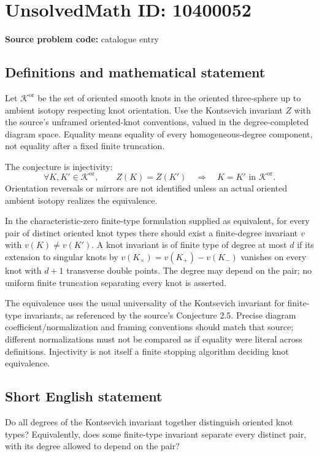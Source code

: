 \documentclass[11pt]{article}
\begin{document}
\section*{UnsolvedMath ID: 10400052}
\textbf{Source problem code:} catalogue entry
\subsection{Definitions and mathematical statement}
Let $\mathcal K^{\mathrm{or}}$ be the set of oriented smooth knots in the oriented three-sphere up to ambient isotopy respecting knot orientation. Use the Kontsevich invariant $Z$ with the source's unframed oriented-knot conventions, valued in the degree-completed diagram space. Equality means equality of every homogeneous-degree component, not equality after a fixed finite truncation.

The conjecture is injectivity:
\[
\forall K,K'\in\mathcal K^{\mathrm{or}},\qquad
Z(K)=Z(K')\quad\Longrightarrow\quad K=K'\text{ in }\mathcal K^{\mathrm{or}}.
\]
Orientation reversals or mirrors are not identified unless an actual oriented ambient isotopy realizes the equivalence.

In the characteristic-zero finite-type formulation supplied as equivalent, for every pair of distinct oriented knot types there should exist a finite-degree invariant $v$ with $v(K)\ne v(K')$. A knot invariant is of finite type of degree at most $d$ if its extension to singular knots by $v(K_\times)=v(K_+)-v(K_-)$ vanishes on every knot with $d+1$ transverse double points. The degree may depend on the pair; no uniform finite truncation separating every knot is asserted.

The equivalence uses the usual universality of the Kontsevich invariant for finite-type invariants, as referenced by the source's Conjecture 2.5. Precise diagram coefficient/normalization and framing conventions should match that source; different normalizations must not be compared as if equality were literal across definitions. Injectivity is not itself a finite stopping algorithm deciding knot equivalence.
\subsection{Short English statement}
Do all degrees of the Kontsevich invariant together distinguish oriented knot types? Equivalently, does some finite-type invariant separate every distinct pair, with its degree allowed to depend on the pair?
\end{document}
